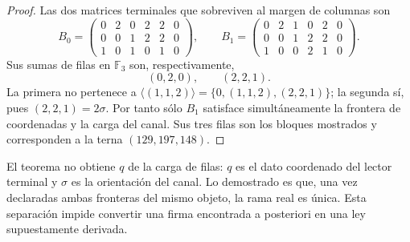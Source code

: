 \begin{proof}
Las dos matrices terminales que sobreviven al margen de columnas son
\[
B_0=
\begin{pmatrix}
0&2&0&2&2&0\\
0&0&1&2&2&0\\
1&0&1&0&1&0
\end{pmatrix},
\qquad
B_1=
\begin{pmatrix}
0&2&1&0&2&0\\
0&0&1&2&2&0\\
1&0&0&2&1&0
\end{pmatrix}.
\]
Sus sumas de filas en \(\mathbb F_3\) son, respectivamente,
\[
 (0,2,0),\qquad(2,2,1).
\]
La primera no pertenece a
\(\langle(1,1,2)\rangle=\{0,(1,1,2),(2,2,1)\}\); la segunda sí, pues
\((2,2,1)=2\sigma\). Por tanto sólo \(B_1\) satisface simultáneamente la
frontera de coordenadas y la carga del canal. Sus tres filas son los bloques
mostrados y corresponden a la terna \((129,197,148)\).
\end{proof}

El teorema no obtiene \(q\) de la carga de filas: \(q\) es el dato
coordenado del lector terminal y \(\sigma\) es la orientación del canal.
Lo demostrado es que, una vez declaradas ambas fronteras del mismo objeto,
la rama real es única. Esta separación impide convertir una firma encontrada
a posteriori en una ley supuestamente derivada.

